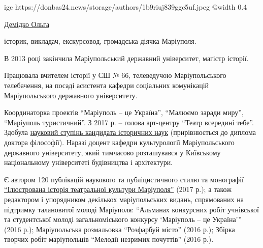  
 
 
 
 


\ifcmt
  igc https://donbas24.news/storage/authors/1b9riuj839ggc5uf.jpeg
  @width 0.4
\fi

\href{https://donbas24.news/author/olga-demidko}{Демідко Ольга}

історик, викладач, екскурсовод, громадська діячка Маріуполя.

В 2013 році закінчила Маріупольський державний університет, магістр історії.

Працювала вчителем історії у СШ № 66, телеведучою Маріупольського телебачення,
на посаді асистента кафедри соціальних комунікацій Маріупольського державного
університету.

Координаторка проектів \enquote{Маріуполь – це Україна}, \enquote{Малюємо
заради миру}, \enquote{Маріуполь туристичний}. З 2017 р. – голова арт-центру
\enquote{Театр всередині тебе}.  Здобула
\href{https://archive.org/details/book.2019.demidko_olga.mariupol.dissertacia}{науковий
ступінь кандидата історичних наук} (прирівнюється до диплома доктора
філософії). Наразі доцент кафедри культурології Маріупольського державного
університету, який тимчасово розташувався у Київському національному
університеті будівництва і архітектури.

Є автором 120 публікацій наукового та публіцистичного стилю та монографії
\href{https://archive.org/details/book.2017.demidko_olga.monografia.illustrovana_istoria_teatr_kultury_mariupolja}{%
\enquote{Ілюстрована історія театральної культури Маріуполя}} (2017 р.); а також
редактором і упорядником декількох маріупольських видань, спрямованих на
підтримку талановитої молоді Маріуполя: \enquote{Альманах конкурсних робіт учнівської
та студентської молоді загальноміського конкурсу \enquote{Маріуполь – це Україна}} (2016
р.); Маріупольська розмальовка \enquote{Розфарбуй місто} (2016 р.); Збірка творчих
робіт маріупольців \enquote{Мелодії незримих почуттів} (2016 р.). 


